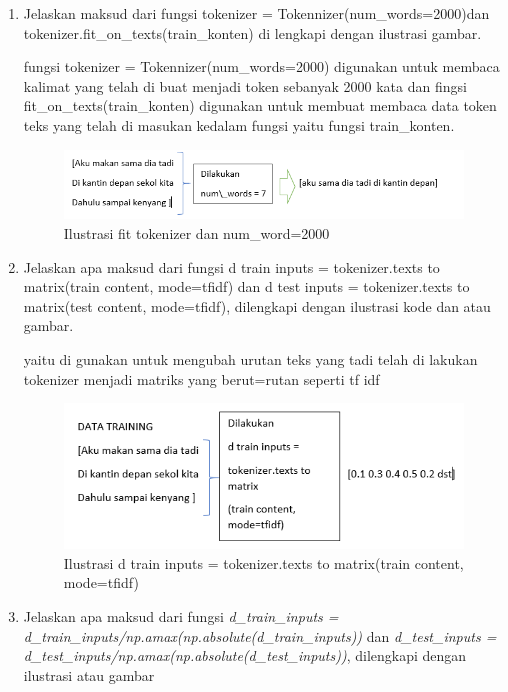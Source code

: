 \begin{enumerate}
\item Jelaskan maksud dari fungsi tokenizer = Tokennizer(num\_words=2000)dan tokenizer.fit\_on\_texts(train\_konten) di lengkapi dengan ilustrasi gambar.\par
fungsi tokenizer = Tokennizer(num\_words=2000) digunakan untuk membaca kalimat yang telah di buat menjadi token sebanyak 2000 kata dan fingsi fit\_on\_texts(train\_konten) digunakan untuk membuat membaca data token teks yang telah di masukan kedalam fungsi yaitu fungsi train\_konten.
\begin{figure}[ht]
\centering
\includegraphics[scale=0.4]{figures/1174012/chapter7/1,5.PNG}
\caption{Ilustrasi fit tokenizer dan num\_word=2000}
\label{Contoh}
\end{figure}


\item Jelaskan apa maksud dari fungsi d train inputs = tokenizer.texts to matrix(train content, mode=tfidf) dan d test inputs = tokenizer.texts to matrix(test content, mode=tfidf), dilengkapi dengan ilustrasi kode dan atau gambar.\par 
yaitu di gunakan untuk mengubah urutan teks yang tadi telah di lakukan tokenizer menjadi matriks yang berut=rutan seperti tf idf 
\begin{figure}[ht]
\centering
\includegraphics[scale=0.4]{figures/1174012/chapter7/1,6.PNG}
\caption{Ilustrasi d train inputs = tokenizer.texts to matrix(train content, mode=tfidf)}
\label{Contoh}
\end{figure}


\item Jelaskan apa maksud dari fungsi \emph{d\_train\_inputs = d\_train\_inputs/np.amax(np.absolute(d\_train\_inputs))} dan \emph{d\_test\_inputs = d\_test\_inputs/np.amax(np.absolute(d\_test\_inputs))}, dilengkapi dengan ilustrasi atau gambar \par


\end{enumerate}
